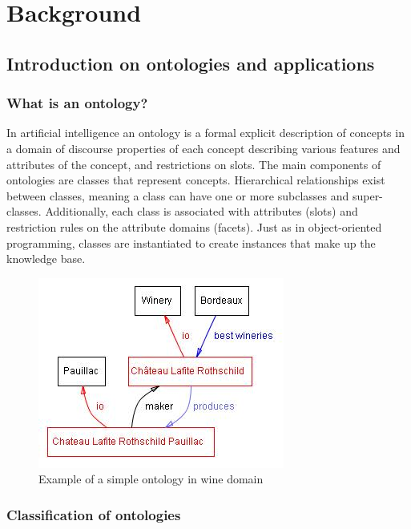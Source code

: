 \chapter{Background}

\section{Introduction on ontologies and applications}

\subsection{What is an ontology?}

In artificial intelligence an ontology is 
a formal explicit description of concepts in a domain of discourse properties of each concept describing various features and attributes of the concept, and restrictions on slots. 
The main components of ontologies are classes that represent concepts. Hierarchical relationships exist between classes, meaning a class can have one or more subclasses and super-classes. Additionally, each class is associated with attributes (slots) and restriction rules on the attribute domains (facets). Just as in object-oriented programming, classes are instantiated to create instances that make up the knowledge base.\cite{protege_ontology}
\begin{figure}[H]
    \centering
    \includegraphics[width=0.5\linewidth]{Figures/fig_0.jpg}
    \caption{Example of a simple ontology in wine domain}
    \label{fig:enter-label}
\end{figure}
\subsection{Classification of ontologies}

